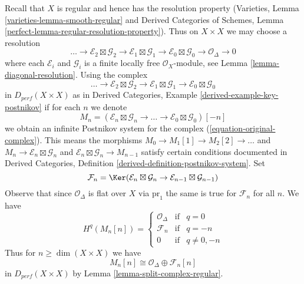 \medskip\noindent
Recall that $X$ is regular and hence has the resolution property
(Varieties, Lemma \ref{varieties-lemma-smooth-regular} and
Derived Categories of Schemes, Lemma
\ref{perfect-lemma-regular-resolution-property}). Thus
on $X \times X$ we may choose a resolution
$$
\ldots \to
\mathcal{E}_2 \boxtimes \mathcal{G}_2 \to
\mathcal{E}_1 \boxtimes \mathcal{G}_1 \to
\mathcal{E}_0 \boxtimes \mathcal{G}_0 \to
\mathcal{O}_\Delta \to 0
$$
where each $\mathcal{E}_i$ and $\mathcal{G}_i$ is a finite locally
free $\mathcal{O}_X$-module, see Lemma \ref{lemma-diagonal-resolution}.
Using the complex
\begin{equation}
\label{equation-original-complex}
\ldots \to
\mathcal{E}_2 \boxtimes \mathcal{G}_2 \to
\mathcal{E}_1 \boxtimes \mathcal{G}_1 \to
\mathcal{E}_0 \boxtimes \mathcal{G}_0
\end{equation}
in $D_{perf}(X \times X)$ as in
Derived Categories, Example \ref{derived-example-key-postnikov}
if for each $n$ we denote
$$
M_n = (\mathcal{E}_n \boxtimes \mathcal{G}_n \to \ldots \to
\mathcal{E}_0 \boxtimes \mathcal{G}_0)[-n]
$$
we obtain an infinite Postnikov system for the complex
(\ref{equation-original-complex}). This means
the morphisms $M_0 \to M_1[1] \to M_2[2] \to \ldots$ and
$M_n \to \mathcal{E}_n \boxtimes \mathcal{G}_n$ and
$\mathcal{E}_n \boxtimes \mathcal{G}_n \to M_{n - 1}$
satisfy certain conditions documented in
Derived Categories, Definition \ref{derived-definition-postnikov-system}.
Set
$$
\mathcal{F}_n = \Ker(\mathcal{E}_n \boxtimes \mathcal{G}_n \to
\mathcal{E}_{n - 1} \boxtimes \mathcal{G}_{n - 1})
$$
Observe that since $\mathcal{O}_\Delta$ is flat over $X$ via $\text{pr}_1$
the same is true for $\mathcal{F}_n$ for all $n$. We have
$$
H^q(M_n[n]) = \left\{
\begin{matrix}
\mathcal{O}_\Delta & \text{if} & q = 0 \\
\mathcal{F}_n & \text{if} & q = -n \\
0 & \text{if} & q \not = 0, -n
\end{matrix}
\right.
$$
Thus for $n \geq \dim(X \times X)$ we have
$$
M_n[n] \cong \mathcal{O}_\Delta \oplus \mathcal{F}_n[n]
$$
in $D_{perf}(X \times X)$ by Lemma \ref{lemma-split-complex-regular}.

